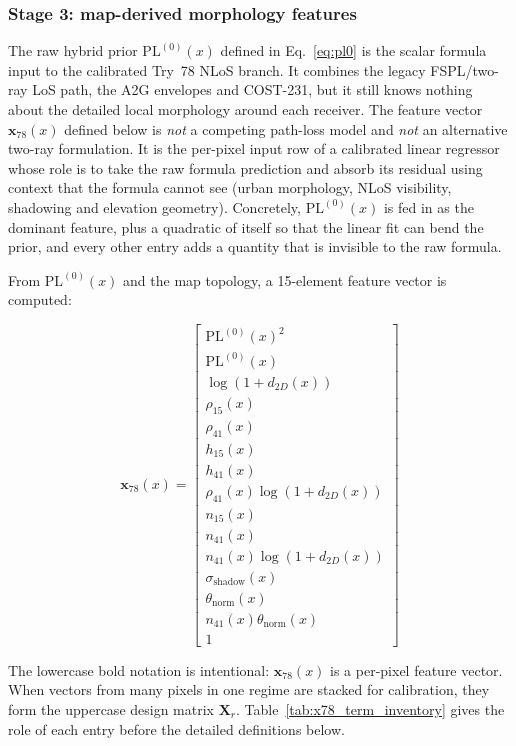 \subsubsection{Stage 3: map-derived morphology features}

The raw hybrid prior $\mathrm{PL}^{(0)}(x)$ defined in Eq.~\eqref{eq:pl0} is
the scalar formula input to the calibrated Try~78 NLoS branch. It combines the
legacy FSPL/two-ray LoS path, the A2G envelopes and COST-231, but it still
knows nothing about the detailed local morphology around each receiver. The
feature vector $\mathbf{x}_{78}(x)$ defined below is \emph{not} a competing
path-loss model and \emph{not} an alternative two-ray formulation. It is the
per-pixel input row of a calibrated linear regressor whose role is to take
the raw formula prediction and absorb its residual using context that the
formula cannot see (urban morphology, NLoS visibility, shadowing and
elevation geometry). Concretely, $\mathrm{PL}^{(0)}(x)$ is fed in as the
dominant feature, plus a quadratic of itself so that the linear fit can bend
the prior, and every other entry adds a quantity that is invisible to the raw
formula.

From $\mathrm{PL}^{(0)}(x)$ and the map topology, a 15-element feature
vector is computed:

\begin{equation}
\textbf{x}_{78}(x)
=
\begin{bmatrix}
\mathrm{PL}^{(0)}(x)^2 \\
\mathrm{PL}^{(0)}(x) \\
\log(1+d_{2D}(x)) \\
\rho_{15}(x) \\
\rho_{41}(x) \\
h_{15}(x) \\
h_{41}(x) \\
\rho_{41}(x)\log(1+d_{2D}(x)) \\
n_{15}(x) \\
n_{41}(x) \\
n_{41}(x)\log(1+d_{2D}(x)) \\
\sigma_{\mathrm{shadow}}(x) \\
\theta_{\mathrm{norm}}(x) \\
n_{41}(x)\theta_{\mathrm{norm}}(x) \\
1
\end{bmatrix}
\label{eq:x78}
\end{equation}

The lowercase bold notation is intentional: \(\textbf{x}_{78}(x)\) is a
per-pixel feature vector. When vectors from many pixels in one regime are
stacked for calibration, they form the uppercase design matrix
\(\textbf{X}_r\). Table~\ref{tab:x78_term_inventory} gives the role of each
entry before the detailed definitions below.

